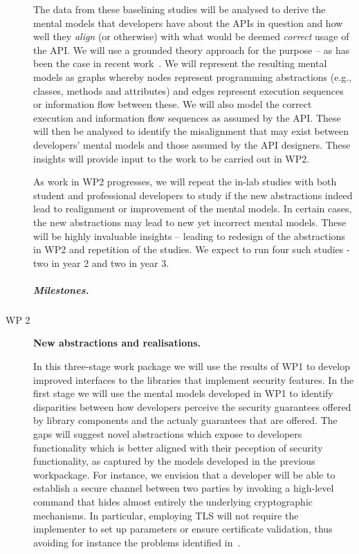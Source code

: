 \documentclass[10pt]{article}
\begin{document}
\begin{description}
The data from these baselining studies will be analysed to derive the mental models that developers have about the APIs in question and how well they \emph{align} (or otherwise) with what would be deemed \emph{correct} usage of the API. We will use a grounded theory approach for the purpose -- as has been the case in recent work~\cite{ramokapane2017}. We will represent the resulting mental models as graphs whereby nodes represent programming abstractions (e.g., classes, methods and attributes) and edges represent execution sequences or information flow between these. We will also model the correct execution and information flow sequences as assumed by the API. These will then be analysed to identify the misalignment that may exist between developers' mental models and those assumed by the API designers. These insights will provide input to the work to be carried out in WP2.

As work in WP2 progresses, we will repeat the in-lab studies with both student and professional developers to study if the new abstractions indeed lead to realignment or improvement of the mental models. In certain cases, the new abstractions may lead to new yet incorrect mental models. These will be highly invaluable insights -- leading to redesign of the abstractions in WP2 and repetition of the studies. We expect to run four such studies - two in year 2 and two in year 3.

\subparagraph{Milestones.} 


\item[WP 2] \textbf{New abstractions and realisations.} 

In this three-stage work package we will use the results of WP1 to develop improved interfaces to the libraries that implement security features.  
In the first stage we will use the mental models developed in WP1 to identify disparities between how developers perceive the security guarantees offered by library components and the actualy guarantees that are offered. The gaps will suggest novel abstractions which expose to developers functionality which is better aligned with their peception of security functionality, as captured by the models developed in the previous workpackage. 
For instance, we envision that a developer will be able to establish a secure channel between two parties by invoking a high-level command that hides almost entirely the underlying cryptographic mechanisms.   In particular, employing TLS will not require the implementer to set up parameters or ensure certificate validation, thus avoiding for instance the problems identified in~\cite{}. 


\end{description}
\end{document}

